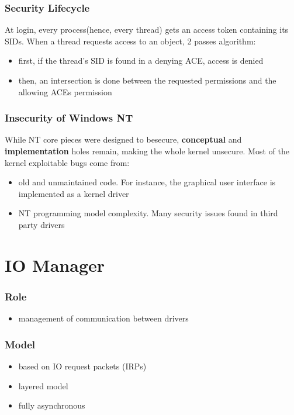 
\begin{frame}
  \frametitle{Security Lifecycle}

  At login, every process(hence, every thread) gets an access token containing its SIDs.
  When a thread requests access to an object, 2 passes algorithm:

  \begin{itemize}
    \item
      first, if the thread's SID is found in a denying ACE, access is denied
    \item
      then, an intersection is done between the requested permissions and the allowing ACEs permission
  \end{itemize}
\end{frame}


\begin{frame}
  \frametitle{Insecurity of Windows NT}

  While NT core pieces were designed to besecure, \textbf{conceptual} and \textbf{implementation}
  holes remain, making the whole kernel unsecure. Most of the kernel exploitable bugs come from:

  \begin{itemize}
    \item
      old and unmaintained code. For instance, the graphical user interface is implemented as a kernel driver
    \item
      NT programming model complexity. Many security issues found in third party drivers
  \end{itemize}

\end{frame}


%
%

\section{IO Manager}


\begin{frame}
 \frametitle{Role}
 \begin{itemize}
  \item
    management of communication between drivers
 \end{itemize}
\end{frame}


\begin{frame}
 \frametitle{Model}
 \begin{itemize}
  \item
    based on IO request packets (IRPs)
  \item
    layered model
  \item
    fully asynchronous
 \end{itemize}
\end{frame}

